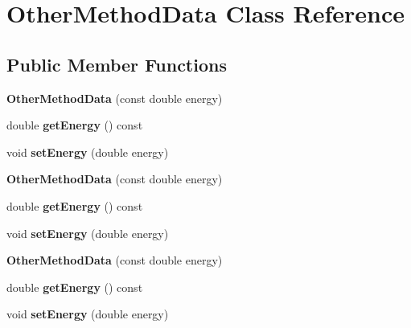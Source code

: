\hypertarget{class_other_method_data}{}\section{Other\+Method\+Data Class Reference}
\label{class_other_method_data}
\subsection*{Public Member Functions}
\begin{DoxyCompactItemize}
\item 
\mbox{\label{class_other_method_data_a4e023d2b3637d04ffa5c996a740847af}} 
{\bfseries Other\+Method\+Data} (const double energy)
\item 
\mbox{\label{class_other_method_data_a5b6dd8bc2ee4022b0880dd9b5c84c647}} 
double {\bfseries get\+Energy} () const
\item 
\mbox{\label{class_other_method_data_ac6312feaf56506a50144d67f913545cf}} 
void {\bfseries set\+Energy} (double energy)
\item 
\mbox{\label{class_other_method_data_a4e023d2b3637d04ffa5c996a740847af}} 
{\bfseries Other\+Method\+Data} (const double energy)
\item 
\mbox{\label{class_other_method_data_a5b6dd8bc2ee4022b0880dd9b5c84c647}} 
double {\bfseries get\+Energy} () const
\item 
\mbox{\label{class_other_method_data_ac6312feaf56506a50144d67f913545cf}} 
void {\bfseries set\+Energy} (double energy)
\item 
\mbox{\label{class_other_method_data_a4e023d2b3637d04ffa5c996a740847af}} 
{\bfseries Other\+Method\+Data} (const double energy)
\item 
\mbox{\label{class_other_method_data_a5b6dd8bc2ee4022b0880dd9b5c84c647}} 
double {\bfseries get\+Energy} () const
\item 
\mbox{\label{class_other_method_data_ac6312feaf56506a50144d67f913545cf}} 
void {\bfseries set\+Energy} (double energy)
\end{DoxyCompactItemize}


